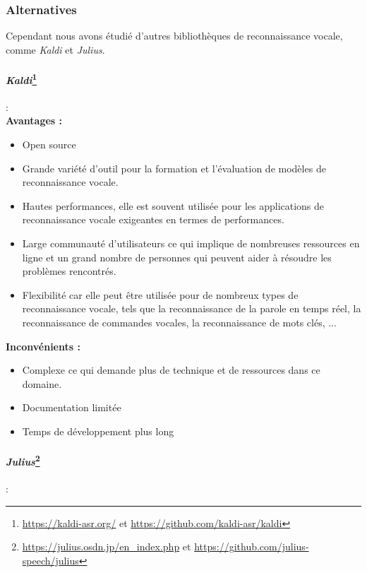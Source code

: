 \subsubsection{Alternatives}

Cependant nous avons étudié d'autres bibliothèques de reconnaissance vocale, comme \textit{Kaldi} et \textit{Julius}.

\paragraph*{\textbf{\textit{Kaldi}}\footnote{\url{https://kaldi-asr.org/} et \url{https://github.com/kaldi-asr/kaldi}}}:\\

\textbf{Avantages :}
\begin{itemize}

    \item Open source
    \item Grande variété d'outil pour la formation et l'évaluation de modèles de reconnaissance vocale.
    \item Hautes performances, elle est souvent utilisée pour les applications de reconnaissance vocale exigeantes en termes de performances.
    \item Large communauté d'utilisateurs ce qui implique de nombreuses ressources en ligne et un grand nombre de personnes qui peuvent aider à résoudre les problèmes rencontrés.
    \item Flexibilité car elle peut être utilisée pour de nombreux types de reconnaissance vocale, tels que la reconnaissance de la parole en temps réel,
          la reconnaissance de commandes vocales, la reconnaissance de mots clés, ...

\end{itemize}

\textbf{Inconvénients :}
\begin{itemize}
    \item Complexe ce qui demande plus de technique et de ressources dans ce domaine.
    \item Documentation limitée
    \item Temps de développement plus long
\end{itemize}

\paragraph*{\textbf{\textit{Julius}}\footnote{\url{https://julius.osdn.jp/en_index.php} et \url{https://github.com/julius-speech/julius}}}: \\

